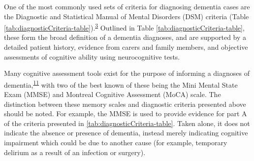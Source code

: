 \documentclass[a4paper, twoside]{templates/ociamthesis}
\begin{document}
One of the most commonly used sets of criteria for diagnosing dementia cases are the Diagnostic and Statistical Manual of Mental Disorders (DSM) criteria (Table \ref{tab:diagnosticCriteria-table}).\textsuperscript{\protect\hyperlink{ref-edition2013}{3}} Outlined in Table \ref{tab:diagnosticCriteria-table}, these form the broad definition of a dementia diagnoses, and are supported by a detailed patient history, evidence from carers and family members, and objective assessments of cognitive ability using neurocognitive tests.

Many cognitive assessment tools exist for the purpose of informing a diagnoses of dementia,\textsuperscript{\protect\hyperlink{ref-sheehan2012}{11}} with two of the best known of these being the Mini Mental State Exam (MMSE) and Montreal Cognitive Assessment (MoCA) scale. The distinction between these memory scales and diagnostic criteria presented above should be noted. For example, the MMSE is used to provide evidence for part A of the criteria presented in \ref{tab:diagnosticCriteria-table}. Taken alone, it does not indicate the absence or presence of dementia, instead merely indicating cognitive impairment which could be due to another cause (for example, temporary delirium as a result of an infection or surgery).

~
\end{document}
